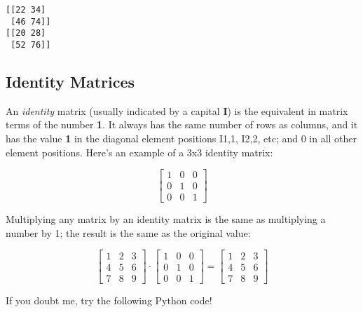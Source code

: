 \documentclass[11pt]{article}
\begin{document}
    \begin{Verbatim}[commandchars=\\\{\}]
[[22 34]
 [46 74]]
[[20 28]
 [52 76]]

    \end{Verbatim}

    \hypertarget{identity-matrices}{%
\subsection{Identity Matrices}\label{identity-matrices}}

An \emph{identity} matrix (usually indicated by a capital \textbf{I}) is
the equivalent in matrix terms of the number \textbf{1}. It always has
the same number of rows as columns, and it has the value \textbf{1} in
the diagonal element positions I1,1, I2,2, etc; and 0 in all other
element positions. Here's an example of a 3x3 identity matrix:

\begin{equation}\begin{bmatrix}1 & 0 & 0\\0 & 1 & 0\\0 & 0 & 1\end{bmatrix} \end{equation}

Multiplying any matrix by an identity matrix is the same as multiplying
a number by 1; the result is the same as the original value:

\begin{equation}\begin{bmatrix}1 & 2 & 3 \\4 & 5 & 6\\7 & 8 & 9\end{bmatrix} \cdot \begin{bmatrix}1 & 0 & 0\\0 & 1 & 0\\0 & 0 & 1\end{bmatrix} = \begin{bmatrix}1 & 2 & 3 \\4 & 5 & 6\\7 & 8 & 9\end{bmatrix} \end{equation}

If you doubt me, try the following Python code!
\end{document}
